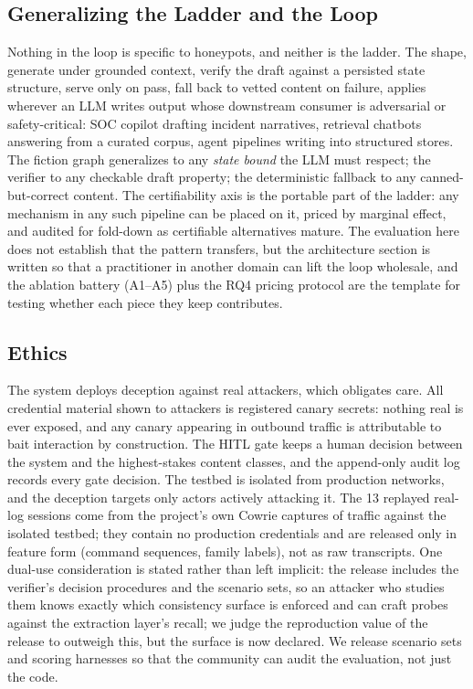 \subsection{Generalizing the Ladder and the Loop}
Nothing in the loop is specific to honeypots, and neither is the ladder.
The shape, generate under
grounded context, verify the draft against a persisted state structure,
serve only on pass, fall back to vetted content on failure, applies
wherever an LLM writes output whose downstream consumer is adversarial or
safety-critical: SOC copilot drafting incident narratives, retrieval
chatbots answering from a curated corpus, agent pipelines writing into
structured stores. The fiction graph generalizes to any \emph{state
bound} the LLM must respect; the verifier to any checkable draft
property; the deterministic fallback to any canned-but-correct content.
The certifiability axis is the portable part of the ladder: any
mechanism in any such pipeline can be placed on it, priced by marginal
effect, and audited for fold-down as certifiable alternatives mature.
The evaluation here does not establish that the
pattern transfers, but the
architecture section is written so that a practitioner in another domain
can lift the loop wholesale, and the ablation battery (A1--A5) plus the
RQ4 pricing protocol are the template for testing whether each piece
they keep contributes.

\subsection{Ethics}
The system deploys deception against real attackers, which obligates
care. All credential material shown to attackers is registered canary
secrets: nothing real is ever exposed, and any canary appearing in
outbound traffic is attributable to bait interaction by construction. The
HITL gate keeps a human decision between the system and the highest-stakes
content classes, and the append-only audit log records every gate
decision. The testbed is isolated from production networks, and the
deception targets only actors actively attacking it. The 13 replayed
real-log sessions come from the project's own Cowrie captures of
traffic against the isolated testbed; they contain no production
credentials and are released only in feature form (command sequences,
family labels), not as raw transcripts. One dual-use consideration is
stated rather than left implicit: the release includes the verifier's
decision procedures and the scenario sets, so an attacker who studies
them knows exactly which consistency surface is enforced and can craft
probes against the extraction layer's recall; we judge the reproduction
value of the release to outweigh this, but the surface is now declared.
We release scenario
sets and scoring harnesses so that the community can audit the
evaluation, not just the code.

